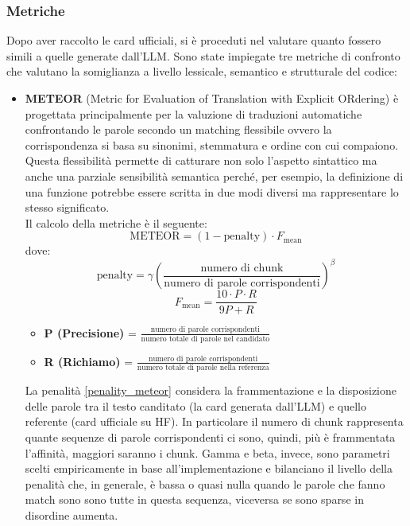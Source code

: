 \documentclass{article}
\begin{document}
\subsubsection{Metriche}
Dopo aver raccolto le card ufficiali, si è proceduti nel valutare quanto fossero simili a quelle generate dall'LLM. Sono state impiegate tre metriche di confronto che valutano la somiglianza a livello lessicale, semantico e strutturale del codice:
\begin{itemize}
    \item \textbf{METEOR} (Metric for Evaluation of Translation with Explicit ORdering) \cite{banerjee2005meteor} è progettata principalmente per la valuzione di traduzioni automatiche confrontando le parole secondo un matching flessibile ovvero la corrispondenza si basa su sinonimi, stemmatura e ordine con cui compaiono. Questa flessibilità permette di catturare non solo l'aspetto sintattico ma anche una parziale sensibilità semantica perché, per esempio, la definizione di una funzione potrebbe essere scritta in due modi diversi ma rappresentare lo stesso significato.\\
    Il calcolo della metriche è il seguente:
    \begin{equation}
        \text{METEOR} = (1 - \text{penalty}) \cdot F_{\text{mean}}
    \end{equation}
    dove:
    \begin{equation} \label{penality_meteor}
        \text{penalty} = \gamma \left( \frac{\text{numero di chunk}}{\text{numero di parole corrispondenti}} \right)^\beta
    \end{equation}
    \begin{equation} \label{media_meteor}
        F_{\text{mean}} = \frac{10 \cdot P \cdot R}{9P + R}
    \end{equation}
    \begin{itemize}
        \item \textbf{P (Precisione)} = $\frac{\text{numero di parole corrispondenti}}{\text{numero totale di parole nel candidato}}$
        \item \textbf{R (Richiamo)} = $\frac{\text{numero di parole corrispondenti}}{\text{numero totale di parole nella referenza}}$
    \end{itemize}
    La penalità \ref{penality_meteor} considera la frammentazione e la disposizione delle parole tra il testo canditato (la card generata dall'LLM) e quello referente (card ufficiale su HF). In particolare il numero di chunk rappresenta quante sequenze di parole corrispondenti ci sono, quindi, più è frammentata l'affinità, maggiori saranno i chunk. Gamma e beta, invece, sono parametri scelti empiricamente in base all'implementazione e bilanciano il livello della penalità che, in generale, è bassa o quasi nulla quando le parole che fanno match sono sono tutte in questa sequenza, viceversa se sono sparse in disordine aumenta.\\

\end{itemize}
\end{document}
